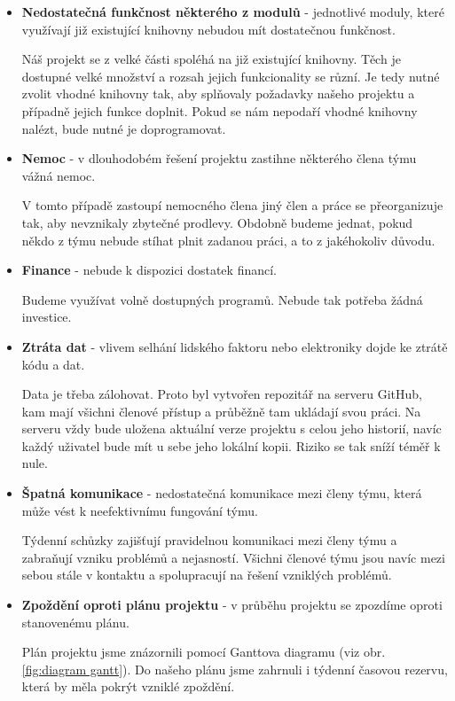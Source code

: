 \documentclass[12pt,a4paper]{article}
\begin{document}
\begin{itemize}
	\item{\textbf{Nedostatečná funkčnost některého z modulů}} - jednotlivé moduly, které využívají již existující knihovny nebudou mít dostatečnou funkčnost.
	
        Náš projekt se z velké části spoléhá na již existující knihovny. Těch je dostupné velké množství a rozsah jejich funkcionality se různí. Je tedy nutné zvolit vhodné knihovny tak, aby splňovaly požadavky našeho projektu a případně jejich funkce doplnit. Pokud se nám nepodaří vhodné knihovny nalézt, bude nutné je doprogramovat.

	\item{\textbf{Nemoc}} - v dlouhodobém řešení projektu zastihne některého člena týmu vážná nemoc. 
	
	V tomto případě zastoupí nemocného člena jiný člen a práce se přeorganizuje tak, aby nevznikaly zbytečné prodlevy. Obdobně budeme jednat, pokud někdo z týmu nebude stíhat plnit zadanou práci, a to z jakéhokoliv důvodu.
	
	\item{\textbf{Finance}} - nebude k dispozici dostatek financí.
	
	Budeme využívat volně dostupných programů. Nebude tak potřeba žádná investice.
	
	\item{\textbf{Ztráta dat}} - vlivem selhání lidského faktoru nebo elektroniky dojde ke ztrátě kódu a dat.
	
	Data je třeba zálohovat. Proto byl vytvořen repozitář na serveru GitHub, kam mají všichni členové přístup a průběžně tam ukládají svou práci. Na serveru vždy bude uložena aktuální verze projektu s celou jeho historií, navíc každý uživatel bude mít u sebe jeho lokální kopii. Riziko se tak sníží téměř k nule. 
	
	\item{\textbf{Špatná komunikace}} - nedostatečná komunikace mezi členy týmu, která může vést k neefektivnímu fungování týmu. 
	
	Týdenní schůzky zajišťují pravidelnou komunikaci mezi členy týmu a zabraňují vzniku problémů a nejasností. Všichni členové týmu jsou navíc mezi sebou stále v kontaktu a spolupracují na řešení vzniklých problémů.
	
	\item{\textbf{Zpoždění oproti plánu projektu}} - v průběhu projektu se zpozdíme oproti stanovenému plánu.

        Plán projektu jsme znázornili pomocí Ganttova diagramu (viz obr. \ref{fig:diagram gantt}). Do našeho plánu jsme zahrnuli i týdenní časovou rezervu, která by měla pokrýt vzniklé zpoždění.
	

\end{itemize}
\end{document}
